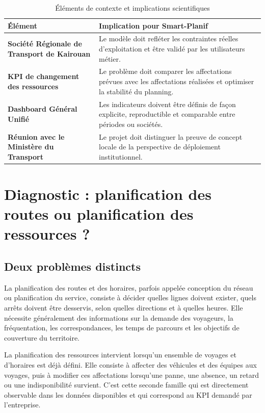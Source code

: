 \documentclass[12pt,a4paper]{article}
\begin{document}
\begin{table}[ht]
\centering
\caption{Éléments de contexte et implications scientifiques}
\begin{tabularx}{\textwidth}{>{\bfseries}p{3.5cm} X}
\toprule
Élément & Implication pour Smart-Planif \\
\midrule
Société Régionale de Transport de Kairouan & Le modèle doit refléter les contraintes réelles d’exploitation et être validé par les utilisateurs métier. \\
KPI de changement des ressources & Le problème doit comparer les affectations prévues avec les affectations réalisées et optimiser la stabilité du planning. \\
Dashboard Général Unifié & Les indicateurs doivent être définis de façon explicite, reproductible et comparable entre périodes ou sociétés. \\
Réunion avec le Ministère du Transport & Le projet doit distinguer la preuve de concept locale de la perspective de déploiement institutionnel. \\
\bottomrule
\end{tabularx}
\end{table}

\section{Diagnostic : planification des routes ou planification des ressources ?}

\subsection{Deux problèmes distincts}

La planification des routes et des horaires, parfois appelée conception du réseau ou planification du service, consiste à décider quelles lignes doivent exister, quels arrêts doivent être desservis, selon quelles directions et à quelles heures. Elle nécessite généralement des informations sur la demande des voyageurs, la fréquentation, les correspondances, les temps de parcours et les objectifs de couverture du territoire.

La planification des ressources intervient lorsqu’un ensemble de voyages et d’horaires est déjà défini. Elle consiste à affecter des véhicules et des équipes aux voyages, puis à modifier ces affectations lorsqu’une panne, une absence, un retard ou une indisponibilité survient. C’est cette seconde famille qui est directement observable dans les données disponibles et qui correspond au KPI demandé par l’entreprise.
\end{document}
